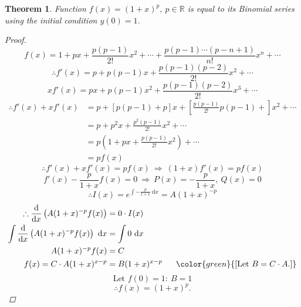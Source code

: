 \documentclass[12pt, a4paper]{article}
\newtheorem{theorem}{Theorem}[subsection]
\newtheorem{proof}{Proof}[subsection]
\def\R{{\mathbb{R}}}
\def\d{{\mathrm{d}}}
\begin{document}
\begin{enumerate}
\begin{itemize}
\begin{theorem}
            Function $f(x)=(1+x)^p,\ p\in\R$ is equal to its Binomial series using the initial condition $y(0)=1$.
            \begin{proof}
                $$f(x)=1+px+\frac{p(p-1)}{2!}x^2+\cdots+\frac{p(p-1)\cdots(p-n+1)}{n!}x^n+\cdots$$
                $$\therefore f'(x)=p+p(p-1)x+\frac{p(p-1)(p-2)}{2!}x^2+\cdots$$
                $$xf'(x)=px+p(p-1)x^2+\frac{p(p-1)(p-2)}{2!}x^3+\cdots$$
                $$\begin{aligned}
                    \therefore f'(x)+xf'(x)&=p+\left[p(p-1)+p\right]x+\left[\frac{p(p-1)}{2!}p(p-1)+\right]x^2+\cdots\\
                    &=p+p^2x+\frac{p^2(p-1)}{2!}x^2+\cdots\\
                    &=p(1+px+\frac{p(p-1)}{2!}x^2)+\cdots\\
                    &=pf(x)
                \end{aligned}$$
                $$\therefore f'(x)+xf'(x)=pf(x) \ \Rightarrow\ (1+x)f'(x)=pf(x)$$
                $$f'(x)-\frac{p}{1+x}f(x)=0\ \Rightarrow\ P(x)=-\frac{p}{1+x},\ Q(x)=0$$
                $$\therefore I(x)=e^{\int -\frac{p}{1+x}\ \d x}=A(1+x)^{-p}$$
                $$\begin{aligned}
                    \therefore \frac{\d}{\d x}\left(A(1+x)^{-p}f(x)\right)&=0\cdot I(x)\\
                    \int \frac{\d}{\d x}\left(A(1+x)^{-p}f(x)\right)\ \d x&=\int 0\ \d x\\
                    A(1+x)^{-p}f(x)&=C\\
                    f(x)=C\cdot A(1+x)^{x-p}&=B(1+x)^{x-p}\ \ \ \ \ {\color{green}{[\text{Let }B=C\cdot A.]}}
                \end{aligned}$$
                $$\text{Let }f(0)=1:\ B=1$$
                $$\therefore f(x)=(1+x)^p.$$
            \end{proof}
        \end{theorem}
    \end{itemize}
\end{enumerate}
\end{document}
